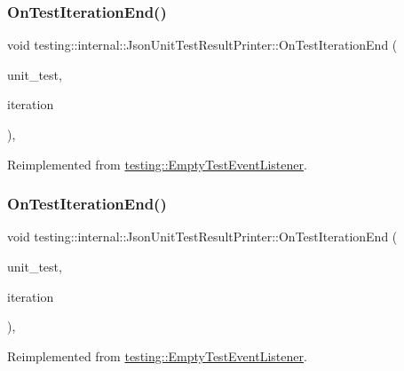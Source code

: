 \subsubsection{\texorpdfstring{OnTestIterationEnd()}{OnTestIterationEnd()}\hspace{0.1cm}{\footnotesize\ttfamily [2/3]}}
{\footnotesize\ttfamily void testing\+::internal\+::\+Json\+Unit\+Test\+Result\+Printer\+::\+On\+Test\+Iteration\+End (\begin{DoxyParamCaption}\item[{const \mbox{\hyperlink{classtesting_1_1_unit_test}{Unit\+Test}} \&}]{unit\+\_\+test,  }\item[{int}]{iteration }\end{DoxyParamCaption})\hspace{0.3cm}{\ttfamily [override]}, {\ttfamily [virtual]}}



Reimplemented from \mbox{\hyperlink{classtesting_1_1_empty_test_event_listener_aae9c5c61e476f0c421402fb1dde434d2}{testing\+::\+Empty\+Test\+Event\+Listener}}.

\mbox{\label{classtesting_1_1internal_1_1_json_unit_test_result_printer_a9716a1dd5a3608181748c1b6f039c365}} 
\subsubsection{\texorpdfstring{OnTestIterationEnd()}{OnTestIterationEnd()}\hspace{0.1cm}{\footnotesize\ttfamily [3/3]}}
{\footnotesize\ttfamily void testing\+::internal\+::\+Json\+Unit\+Test\+Result\+Printer\+::\+On\+Test\+Iteration\+End (\begin{DoxyParamCaption}\item[{const \mbox{\hyperlink{classtesting_1_1_unit_test}{Unit\+Test}} \&}]{unit\+\_\+test,  }\item[{int}]{iteration }\end{DoxyParamCaption})\hspace{0.3cm}{\ttfamily [override]}, {\ttfamily [virtual]}}



Reimplemented from \mbox{\hyperlink{classtesting_1_1_empty_test_event_listener_aae9c5c61e476f0c421402fb1dde434d2}{testing\+::\+Empty\+Test\+Event\+Listener}}.


